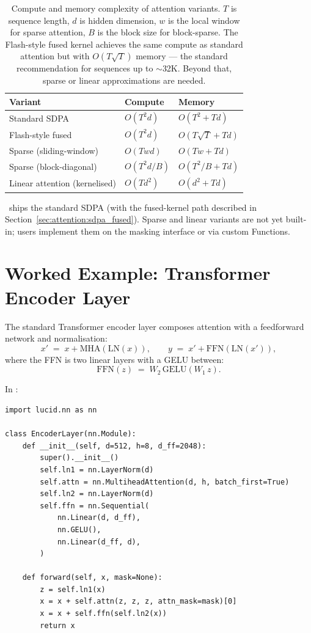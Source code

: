 \begin{table}[t]
\centering
\small
\begin{tabular}{lll}
\toprule
Variant & Compute & Memory \\
\midrule
Standard SDPA       & $O(T^2 d)$ & $O(T^2 + T d)$ \\
Flash-style fused   & $O(T^2 d)$ & $O(T \sqrt{T} + T d)$ \\
Sparse (sliding-window) & $O(T w d)$ & $O(T w + T d)$ \\
Sparse (block-diagonal) & $O(T^2 d / B)$ & $O(T^2 / B + T d)$ \\
Linear attention (kernelised) & $O(T d^2)$ & $O(d^2 + T d)$ \\
\bottomrule
\end{tabular}
\caption[Attention complexity.]{Compute and memory complexity
of attention variants. $T$ is sequence length, $d$ is hidden
dimension, $w$ is the local window for sparse attention, $B$ is
the block size for block-sparse. The Flash-style fused kernel
achieves the same compute as standard attention but with
$O(T \sqrt{T})$ memory --- the standard recommendation for
sequences up to $\sim$32K. Beyond that, sparse or linear
approximations are needed.}
\label{tab:attention:complexity}
\end{table}

\Lucid\ ships the standard SDPA (with the fused-kernel path
described in Section~\ref{sec:attention:sdpa_fused}). Sparse
and linear variants are not yet built-in; users implement them
on the masking interface or via custom Functions.

\section{Worked Example: Transformer Encoder Layer}
\label{sec:attention:transformer_encoder}

The standard Transformer encoder layer composes attention with
a feedforward network and normalisation:
\[
x' \;=\; x + \mathrm{MHA}(\mathrm{LN}(x)),
\qquad
y \;=\; x' + \mathrm{FFN}(\mathrm{LN}(x')),
\]
where the FFN is two linear layers with a GELU between:
\[
\mathrm{FFN}(z) \;=\; W_2\,\mathrm{GELU}(W_1\, z).
\]

In \Lucid:

\begin{lstlisting}[style=lucid,language=LucidPython]
import lucid.nn as nn

class EncoderLayer(nn.Module):
    def __init__(self, d=512, h=8, d_ff=2048):
        super().__init__()
        self.ln1 = nn.LayerNorm(d)
        self.attn = nn.MultiheadAttention(d, h, batch_first=True)
        self.ln2 = nn.LayerNorm(d)
        self.ffn = nn.Sequential(
            nn.Linear(d, d_ff),
            nn.GELU(),
            nn.Linear(d_ff, d),
        )

    def forward(self, x, mask=None):
        z = self.ln1(x)
        x = x + self.attn(z, z, z, attn_mask=mask)[0]
        x = x + self.ffn(self.ln2(x))
        return x
\end{lstlisting}

